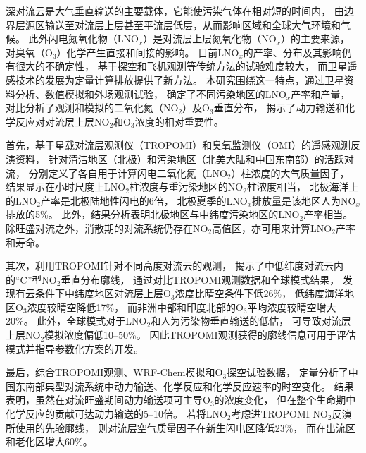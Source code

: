 
\abstract
{
深对流云是大气垂直输送的主要载体，它能使污染气体在相对短的时间内，
由边界层源区输送至对流层上层甚至平流层低层，从而影响区域和全球大气环境和气候。
此外闪电氮氧化物（LNO$_x$）是对流层上层氮氧化物（NO$_x$）的主要来源，
对臭氧（O$_3$）化学产生直接和间接的影响。
目前LNO$_x$的产率、分布及其影响仍有很大的不确定性，
基于探空和飞机观测等传统方法的试验难度较大，
而卫星遥感技术的发展为定量计算排放提供了新方法。
本研究围绕这一特点，通过卫星资料分析、数值模拟和外场观测试验，
确定了不同污染地区的LNO$_x$产率和产量，
对比分析了观测和模拟的二氧化氮（NO$_2$）及O$_3$垂直分布，
揭示了动力输送和化学反应对对流层上层NO$_2$和O$_3$浓度的相对重要性。

首先，基于星载对流层观测仪（TROPOMI）和臭氧监测仪（OMI）的遥感观测反演资料，
针对清洁地区（北极）和污染地区（北美大陆和中国东南部）的活跃对流，
分别定义了各自用于计算闪电二氧化氮（LNO$_2$）柱浓度的大气质量因子，
结果显示在小时尺度上LNO$_2$柱浓度与重污染地区的NO$_2$柱浓度相当，
北极海洋上的LNO$_2$产率是北极陆地性闪电的6倍，
北极夏季的LNO$_x$排放量是该地区人为NO$_x$排放的5\%。
此外，结果分析表明北极地区与中纬度污染地区的LNO$_2$产率相当。
除旺盛对流之外，消散期的对流系统仍存在NO$_2$高值区，亦可用来计算LNO$_2$产率和寿命。

其次，利用TROPOMI针对不同高度对流云的观测，
揭示了中低纬度对流云内的“C”型NO$_2$垂直分布廓线，
通过对比TROPOMI观测数据和全球模式结果，
发现有云条件下中纬度地区对流层上层O$_3$浓度比晴空条件下低26\%，
低纬度海洋地区O$_3$浓度较晴空降低17\%，
而非洲中部和印度北部的O$_3$平均浓度较晴空增大20\%。
此外，全球模式对于LNO$_2$和人为污染物垂直输送的低估，
可导致对流层上层NO$_2$模拟浓度偏低10--50\%。
因此TROPOMI观测获得的廓线信息可用于评估模式并指导参数化方案的开发。

最后，综合TROPOMI观测、WRF-Chem模拟和O$_3$探空试验数据，
定量分析了中国东南部典型对流系统中动力输送、化学反应和化学反应速率的时空变化。
结果表明，虽然在对流旺盛期间动力输送项可主导O$_3$的浓度变化，
但在整个生命期中化学反应的贡献可达动力输送的5--10倍。
若将LNO$_2$考虑进TROPOMI NO$_2$反演所使用的先验廓线，
则对流层空气质量因子在新生闪电区降低23\%，
而在出流区和老化区增大60\%。
}
